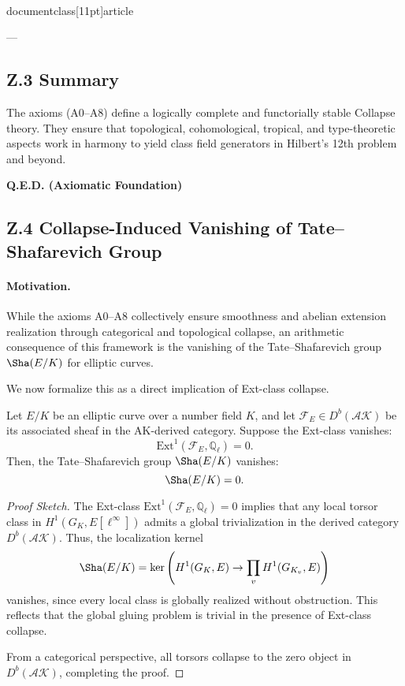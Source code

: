 \\documentclass[11pt]{article}
\begin{document}
---

\subsection*{Z.3 Summary}

The axioms (A0–A8) define a logically complete and functorially stable Collapse theory.  
They ensure that topological, cohomological, tropical, and type-theoretic aspects work in harmony  
to yield class field generators in Hilbert’s 12th problem and beyond.

\begin{center}
\LARGE \textbf{Q.E.D. (Axiomatic Foundation)}
\end{center}


\subsection*{Z.4 Collapse-Induced Vanishing of Tate–Shafarevich Group}

\paragraph{Motivation.}
While the axioms A0–A8 collectively ensure smoothness and abelian extension realization through categorical and topological collapse,  
an arithmetic consequence of this framework is the vanishing of the Tate–Shafarevich group \( \Sha(E/K) \) for elliptic curves.

We now formalize this as a direct implication of Ext-class collapse.

\begin{theorem}
Let \( E/K \) be an elliptic curve over a number field \( K \), and let \( \mathcal{F}_E \in D^b(\mathcal{AK}) \) be its associated sheaf in the AK-derived category.  
Suppose the Ext-class vanishes:
\[
\mathrm{Ext}^1(\mathcal{F}_E, \mathbb{Q}_\ell) = 0.
\]
Then, the Tate–Shafarevich group \( \Sha(E/K) \) vanishes:
\[
\Sha(E/K) = 0.
\]
\end{theorem}

\begin{proof}[Proof Sketch]
The Ext-class \( \mathrm{Ext}^1(\mathcal{F}_E, \mathbb{Q}_\ell) = 0 \) implies that any local torsor class in \( H^1(G_K, E[\ell^\infty]) \) admits a global trivialization in the derived category \( D^b(\mathcal{AK}) \).  
Thus, the localization kernel
\[
\Sha(E/K) = \ker\left( H^1(G_K, E) \rightarrow \prod_v H^1(G_{K_v}, E) \right)
\]
vanishes, since every local class is globally realized without obstruction.  
This reflects that the global gluing problem is trivial in the presence of Ext-class collapse.

From a categorical perspective, all torsors collapse to the zero object in \( D^b(\mathcal{AK}) \), completing the proof.
\end{proof}
\end{document}
